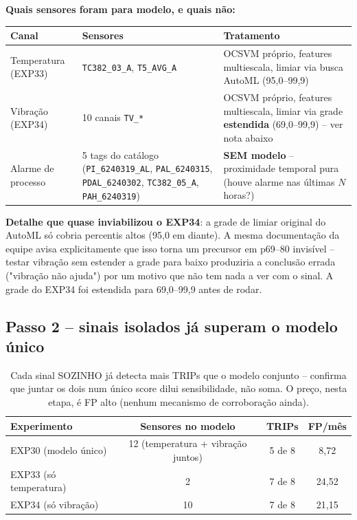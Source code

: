 \documentclass[11pt,a4paper]{article}
\begin{document}
\textbf{Quais sensores foram para modelo, e quais não:}

\begin{table}[H]
\centering
\small
\begin{tabular}{p{3cm}p{6cm}p{5.5cm}}
\toprule
\textbf{Canal} & \textbf{Sensores} & \textbf{Tratamento} \\
\midrule
Temperatura (EXP33) & \texttt{TC382\_03\_A}, \texttt{T5\_AVG\_A} & OCSVM próprio, features multiescala, limiar via busca AutoML (95,0--99,9) \\
Vibração (EXP34) & 10 canais \texttt{TV\_*} & OCSVM próprio, features multiescala, limiar via grade \textbf{estendida} (69,0--99,9) -- ver nota abaixo \\
Alarme de processo & 5 tags do catálogo (\texttt{PI\_6240319\_AL}, \texttt{PAL\_6240315}, \texttt{PDAL\_6240302}, \texttt{TC382\_05\_A}, \texttt{PAH\_6240319}) & \textbf{SEM modelo} -- proximidade temporal pura (houve alarme nas últimas $N$ horas?) \\
\bottomrule
\end{tabular}
\end{table}

\textbf{Detalhe que quase inviabilizou o EXP34}: a grade de limiar
original do AutoML só cobria percentis altos (95,0 em diante). A
mesma documentação da equipe avisa explicitamente que isso torna um
precursor em p69--80 invisível -- testar vibração sem estender a
grade para baixo produziria a conclusão errada ("vibração não ajuda")
por um motivo que não tem nada a ver com o sinal. A grade do EXP34 foi
estendida para 69,0--99,9 antes de rodar.

\subsection{Passo 2 -- sinais isolados já superam o modelo único}

\begin{table}[H]
\centering
\begin{tabular}{lccc}
\toprule
\textbf{Experimento} & \textbf{Sensores no modelo} & \textbf{TRIPs} & \textbf{FP/mês} \\
\midrule
EXP30 (modelo único) & 12 (temperatura + vibração juntos) & 5 de 8 & 8,72 \\
EXP33 (só temperatura) & 2 & 7 de 8 & 24,52 \\
EXP34 (só vibração) & 10 & 7 de 8 & 21,15 \\
\bottomrule
\end{tabular}
\caption{Cada sinal SOZINHO já detecta mais TRIPs que o modelo
conjunto -- confirma que juntar os dois num único score dilui
sensibilidade, não soma. O preço, nesta etapa, é FP alto (nenhum
mecanismo de corroboração ainda).}
\end{table}
\end{document}
